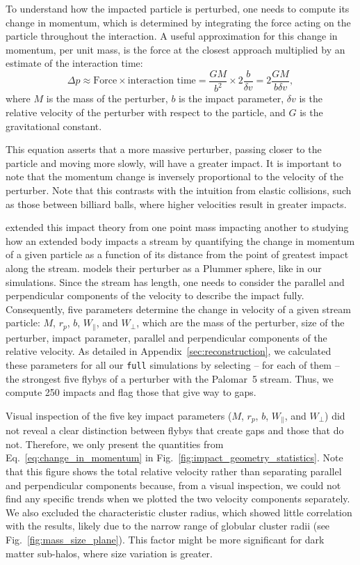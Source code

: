 \documentclass{aa}
\begin{document}
    To understand how the impacted particle is perturbed, one needs to compute its change in momentum, which is determined by integrating the force acting on the particle throughout the interaction. A useful approximation for this change in momentum, per unit mass, is the force at the closest approach multiplied by an estimate of the interaction time:
    \begin{equation} \label{eq:change_in_momentum} \Delta p \approx \text{Force} \times \text{interaction time} = \frac{GM}{b^2} \times 2\frac{b}{\delta v} = 2\frac{GM}{b \delta v}, \end{equation}where $M$ is the mass of the perturber, $b$ is the impact parameter, $\delta v$ is the relative velocity of the perturber with respect to the particle, and $G$ is the gravitational constant. 


    This equation asserts that a more massive perturber, passing closer to the particle and moving more slowly, will have a greater impact. It is important to note that the momentum change is inversely proportional to the velocity of the perturber. Note that this contrasts with the intuition from elastic collisions, such as those between billiard balls, where higher velocities result in greater impacts.

    \citet{2015MNRAS.450.1136E} extended this impact theory from one point mass impacting another to studying how an extended body impacts a stream by quantifying the change in momentum of a given particle as a function of its distance from the point of greatest impact along the stream. \citet{2015MNRAS.450.1136E} models their perturber as a Plummer sphere, like in our simulations. Since the stream has length, one needs to consider the parallel and perpendicular components of the velocity to describe the impact fully. Consequently, five parameters determine the change in velocity of a given stream particle: $M$, $r_p$, $b$, $W_\parallel$, and $W_\perp$, which are the mass of the perturber, size of the perturber, impact parameter, parallel and perpendicular components of the relative velocity. As detailed in Appendix~\ref{sec:reconstruction}, we calculated these parameters for all our \texttt{full} simulations by selecting -- for each of them --  the strongest five flybys of a perturber with the Palomar~5 stream. Thus, we compute 250 impacts and flag those that give way to gaps. 


    Visual inspection of the five key impact parameters ($M$, $r_p$, $b$, $W_\parallel$, and $W_\perp$) did not reveal a clear distinction between flybys that create gaps and those that do not. Therefore, we only present the quantities from Eq.~\ref{eq:change_in_momentum} in Fig.~\ref{fig:impact_geometry_statistics}. 
    Note that this figure shows the total relative velocity rather than separating parallel and perpendicular components because, from a visual inspection, we could not find any specific trends when we plotted the two velocity components separately. We also excluded the characteristic cluster radius, which showed little correlation with the results, likely due to the narrow range of globular cluster radii (see Fig.~\ref{fig:mass_size_plane}). This factor might be more significant for dark matter sub-halos, where size variation is greater.
      
\end{document}
